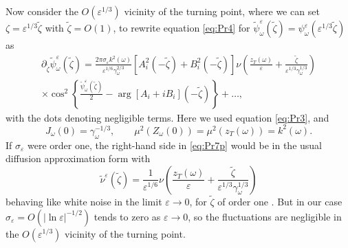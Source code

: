 \documentclass[final]{siamltex}
\begin{document}
Now consider the $O({\varepsilon}^{1/3})$ vicinity of the turning point, where
we can set $\zeta = {\varepsilon}^{1/3} \tilde{\zeta}$ with $\tilde{\zeta} =
O(1)$, to rewrite equation \eqref{eq:Pr4} for $\widetilde
\psi_{\omega}^{\varepsilon}(\tilde{\zeta}) = \psi_{\omega}^{\varepsilon}({\varepsilon}^{1/3}\tilde{\zeta})$ as
\begin{align}
\partial_{\tilde{\zeta}} \widetilde \psi_{\omega}^{\varepsilon}(\tilde{\zeta}) =
\frac{2 \pi \sigma_{\varepsilon} k^2({\omega})}{{\varepsilon}^{1/6} \gamma_{\omega}^{2/3}}
\left[A_i^2(-\tilde{\zeta}) + B_i^2(-\tilde{\zeta})\right] \nu \left(
\frac{z_T({\omega})}{\varepsilon} + \frac{\tilde{\zeta}}{{\varepsilon}^{1/3}
  \gamma_{\omega}^{1/3}} \right) \nonumber \\ \times \cos^2 \left\{
\frac{\widetilde \psi_{\omega}^{\varepsilon}(\tilde{\zeta})}{2} - \arg
[A_i + i B_i](-\tilde{\zeta}) \right\} +
\ldots,
\label{eq:Pr7p}
\end{align}
with the dots denoting negligible terms. Here we used equation
\eqref{eq:Pr3}, and 
\[J_{\omega}(0) = \gamma_{\omega}^{-1/3}, \qquad \mu^2(Z_{\omega}(0)) =
\mu^2(z_T({\omega})) = k^2({\omega}).
\]  
If $\sigma_{\varepsilon}$ were order one, the right-hand side in \eqref{eq:Pr7p}
would be in the usual diffusion approximation form with 
\[
\widetilde \nu^{\varepsilon}(\tilde \zeta) =  \frac{1}{{\varepsilon}^{1/6}}
\nu\left(\frac{z_T({\omega})}{\varepsilon}+ \frac{\tilde{\zeta}}{{\varepsilon}^{1/3}
  \gamma_{\omega}^{1/3}} \right) 
\] behaving like white noise in the limit
${\varepsilon} \to 0$, for $\tilde{\zeta}$ of order one
\cite{papanicolaou1974asymptotic}. But in our case $\sigma_{\varepsilon} =
O(|\ln {\varepsilon}|^{-1/2})$ tends to zero as ${\varepsilon} \to 0$, so the fluctuations
are negligible in the $O({\varepsilon}^{1/3})$ vicinity of the turning point.
\end{document}
